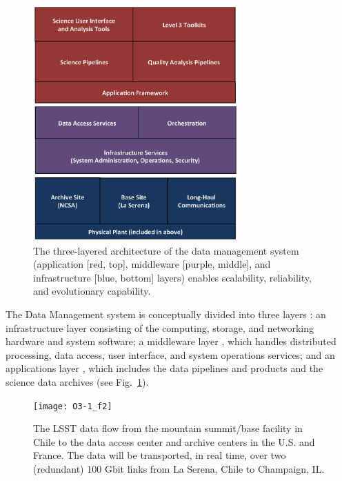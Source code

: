 \documentclass[11pt,twoside]{article}
\begin{document}
\begin{figure}[!t]
%
%
\begin{center}
\includegraphics[width=0.7\textwidth,clip]{O3-1_f1}
\end{center}
\caption{The three-layered architecture of the data management system
(application [red, top], middleware [purple, middle], and infrastructure [blue, bottom] layers) enables scalability, reliability, and evolutionary capability.}
\label{Fig:DM1}
\end{figure}

The Data Management system is conceptually divided into three layers
\citep{LDM-148}: an infrastructure layer \citep{LDM-129} consisting of the computing, storage, and
networking hardware and system software; a middleware layer \citep{LDM-152}, which
handles distributed processing, data access, user interface, and
system operations services; and an applications layer
\citep{LDM-151,LDM-135,LDM-131}, which includes
the data pipelines and products and the science data archives (see
Fig.~\ref{Fig:DM1}).

\begin{figure}[!t]
%
%
\begin{center}
\texttt{[image: O3-1\_f2]}
\end{center}
\caption{The LSST data flow from the mountain summit/base facility in
Chile to the data access center and archive centers in the U.S. and France.
The data will be transported, in real time, over two (redundant) 
100 Gbit links from La Serena, Chile to Champaign, IL.
}
\label{Fig:DM2}
\end{figure}
\end{document}
